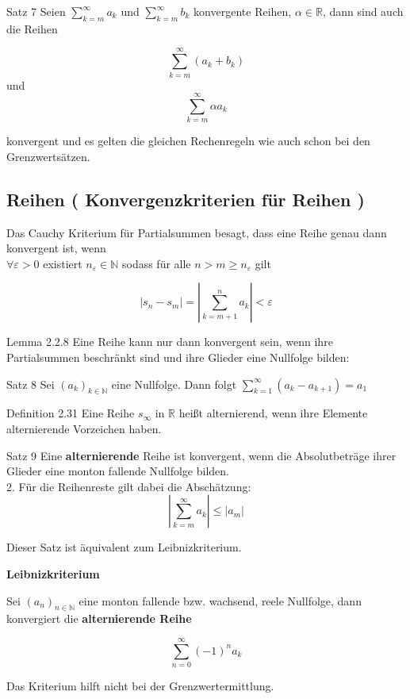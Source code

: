 \documentclass[smallheadings,headsepline,12pt,a4paper]{scrartcl}
\begin{document}
\item[Satz 7] 
Seien $\sum\limits_{k=m}^{\infty} a_k$ und $\sum\limits_{k=m}^{\infty} b_k$ konvergente Reihen, $\alpha \in \mathbb{R}$, dann sind auch die Reihen

$$ \sum\limits_{k=m}^{\infty} (a_k+b_k) $$ und  $$\sum\limits_{k=m}^{\infty} \alpha a_k$$

konvergent und es gelten die gleichen Rechenregeln wie auch schon bei den Grenzwertsätzen. \\

\newpage

\subsection*{Reihen ( Konvergenzkriterien für Reihen ) }

Das Cauchy Kriterium für Partialsummen besagt, dass eine Reihe genau dann konvergent ist, wenn \\

$\forall \varepsilon >0 $ existiert $ n_\varepsilon \in \mathbb{N} $ sodass für alle $n>m\geq  n_\varepsilon$ gilt 

$$ |s_n - s_m| = |\sum\limits_{k=m+1}^{n} a_k| < \varepsilon $$

\item[Lemma 2.2.8]
Eine Reihe kann nur dann konvergent sein, wenn ihre Partialsummen beschränkt sind und ihre Glieder eine Nullfolge bilden: \\

\item[Satz 8] 
Sei $(a_k)_{k \in \mathbb{N}}$ eine Nullfolge. Dann folgt $\sum\limits_{k=1}^{\infty} (a_k - a_{k+1})=a_1$

\item[Definition 2.31]
Eine Reihe $s_{\infty}$ in $\mathbb{R}$ heißt alternierend, wenn ihre Elemente alternierende Vorzeichen haben.

\item[Satz 9]
Eine \textbf{alternierende} Reihe ist konvergent, wenn die Absolutbeträge ihrer Glieder eine monton fallende Nullfolge bilden. \\

2. Für die Reihenreste gilt dabei die Abschätzung: \\
$$ |\sum\limits_{k=m}^{\infty} a_k| \leq |a_m|$$

Dieser Satz ist äquivalent zum Leibnizkriterium. \\

\item[\textbf{Leibnizkriterium}]

Sei $(a_n)_{n \in \mathbb{N}}$ eine monton fallende bzw. wachsend, reele Nullfolge, dann konvergiert die \textbf{alternierende Reihe}

$$ \sum\limits_{n=0}^{\infty} (-1)^n a_k$$

Das Kriterium hilft nicht bei der Grenzwertermittlung. \\
\end{document}
